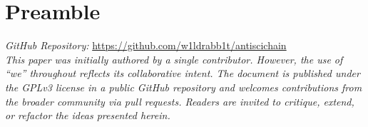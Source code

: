 \documentclass{article}
\begin{document}
\section*{Preamble}
\textit{GitHub Repository:} \url{https://github.com/w1ldrabb1t/antiscichain}\\

\textit{This paper was initially authored by a single contributor. However, the use of “we” throughout reflects its collaborative intent. The document is published under the GPLv3 license in a public GitHub repository and welcomes contributions from the broader community via pull requests. Readers are invited to critique, extend, or refactor the ideas presented herein.}














\end{document}
